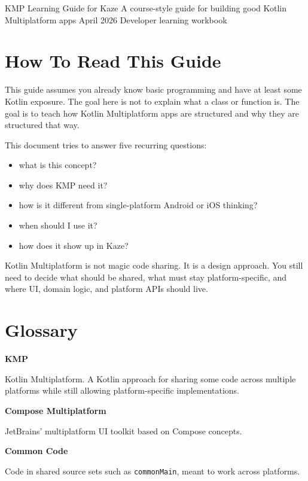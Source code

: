 \documentclass[11pt,a4paper]{article}
\begin{document}
\KazeCover
  {KMP Learning Guide for Kaze}
  {A course-style guide for building good Kotlin Multiplatform apps}
  {April 2026}
  {Developer learning workbook}

\KazeDocumentNotice

\section{How To Read This Guide}

This guide assumes you already know basic programming and have at least some Kotlin exposure. The goal here is not to explain what a class or function is. The goal is to teach how Kotlin Multiplatform apps are structured and why they are structured that way.

This document tries to answer five recurring questions:
\begin{itemize}
    \item what is this concept?
    \item why does KMP need it?
    \item how is it different from single-platform Android or iOS thinking?
    \item when should I use it?
    \item how does it show up in Kaze?
\end{itemize}

\begin{kazecalloutbox}
Kotlin Multiplatform is not magic code sharing. It is a design approach. You still need to decide what should be shared, what must stay platform-specific, and where UI, domain logic, and platform APIs should live.
\end{kazecalloutbox}

\section{Glossary}

\textbf{KMP}

Kotlin Multiplatform. A Kotlin approach for sharing some code across multiple platforms while still allowing platform-specific implementations.

\textbf{Compose Multiplatform}

JetBrains' multiplatform UI toolkit based on Compose concepts.

\textbf{Common Code}

Code in shared source sets such as \texttt{commonMain}, meant to work across platforms.
\end{document}
